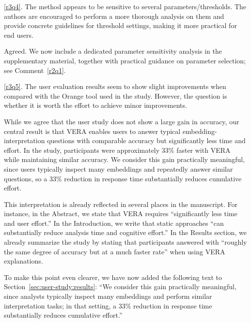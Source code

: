 \documentclass[11pt]{article}
\newcounter{rtaskno}
\newcommand{\rtask}[1]{\refstepcounter{rtaskno}\label{#1}}
\newcommand{\reviewc}[2]{\begin{leftbar}\noindent\rtask{#1}\ref{#1}. #2\end{leftbar}\vspace*{-4mm}}
\newcommand{\answer}[1]{\noindent #1\par\vspace{2mm}}
\newlength{\leftbarwidth}
\newlength{\leftbarsep}
\renewenvironment{leftbar}{%
    \def\FrameCommand{{\color{black}{\vrule width \leftbarwidth\relax\hspace {\leftbarsep}}}}%
    \MakeFramed {\advance \hsize -\width \FrameRestore }%
}{\endMakeFramed}
\begin{document}
\reviewc{r3q4}{The method appears to be sensitive to several parameters/thresholds. The authors are encouraged to perform a more thorough analysis on them and provide concrete guidelines for threshold settings, making it more practical for end users.}

\answer{%
Agreed. We now include a dedicated parameter sensitivity analysis in the supplementary material, together with practical guidance on parameter selection; see Comment~\ref{r2q1}.
}


\reviewc{r3q5}{The user evaluation results seem to show slight improvements when compared with the Orange tool used in the study. However, the question is whether it is worth the effort to achieve minor improvements.}

\answer{%
While we agree that the user study does not show a large gain in accuracy, our central result is that VERA enables users to answer typical embedding-interpretation questions with comparable accuracy but significantly less time and effort. In the study, participants were approximately 33\% faster with VERA while maintaining similar accuracy. We consider this gain practically meaningful, since users typically inspect many embeddings and repeatedly answer similar questions, so a 33\% reduction in response time substantially reduces cumulative effort.

This interpretation is already reflected in several places in the manuscript. For instance, in the Abstract, we state that VERA requires ``significantly less time and user effort.'' In the Introduction, we write that static approaches ``can substantially reduce analysis time and cognitive effort.'' In the Results section, we already summarize the study by stating that participants answered with ``roughly the same degree of accuracy but at a much faster rate'' when using VERA explanations.

To make this point even clearer, we have now added the following text to Section~\ref{sec:user-study:results}: ``We consider this gain practically meaningful, since analysts typically inspect many embeddings and perform similar interpretation tasks; in that setting, a 33\% reduction in response time substantially reduces cumulative effort.''
}






\end{document}
